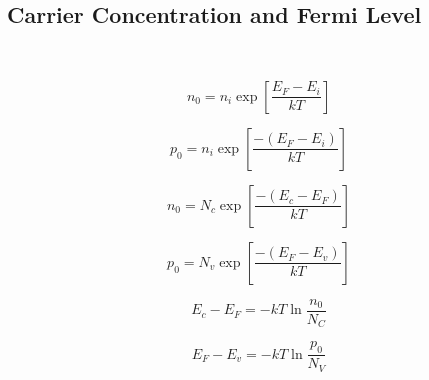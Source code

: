 \documentclass{infosheet}
\begin{document}
\lipsum[1]

\subsection{Carrier Concentration and Fermi Level}\

\begin{multicols}{2}
  \begin{displaymath}
    n_0 = n_i\exp\left[\frac{E_F-E_i}{kT}\right]
  \end{displaymath}
  
  \begin{displaymath}
    p_0 = n_i\exp\left[\frac{-(E_F-E_i)}{kT}\right]
  \end{displaymath}
\end{multicols}

\begin{multicols}{2}
  \begin{displaymath}
    n_0 = N_c\exp\left[\frac{-(E_c-E_F)}{kT}\right]
  \end{displaymath}
  
  \begin{displaymath}
    p_0 = N_v\exp\left[\frac{-(E_F-E_v)}{kT}\right]
  \end{displaymath}
\end{multicols}

\begin{multicols}{2}
  \begin{displaymath}
    E_c-E_F = -kT\ln\frac{n_0}{N_C}
  \end{displaymath}
  
  \begin{displaymath}
    E_F-E_v = -kT\ln\frac{p_0}{N_V}
  \end{displaymath}
\end{multicols}

\lipsum[1-3]
\end{document}
